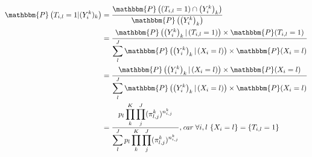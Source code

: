 \documentclass[frenchb]{report}
\newcommand{\1}{\mathbbm{1}}
\newcommand{\prob}{\mathbbm{P}}
\theoremstyle{definition}\newtheorem{defn}{Définition}
\theoremstyle{definition}\newtheorem{exm}{Exemple}
\theoremstyle{definition}\newtheorem{nota}{Notation}
\theoremstyle{definition}\newtheorem{rem}{Remarque}
\begin{document}
\begin{center}
	\begin{align*}
		\prob\left( T_{i,l} = 1 |(Y^k_i)_k \right) &= \displaystyle \frac{\prob \left( \left( T_{i,l} = 1 \right) \cap \left(Y^k_i\right)_k\right)}{\prob \left( \left( Y^k_i \right)_k \right)}\\
		&= \displaystyle \frac{\prob \left( \left(Y^k_i \right)_k | \left( T_{i,l} =1 \right) \right) \times \prob (T_{i,l} = 1)}{\displaystyle \sum_l^J \prob \left( \left(Y^k_i \right)_k | \left( X_i = l \right) \right) \times \prob (X_i = l)}\\
		&= \displaystyle \frac{\prob \left( \left(Y^k_i \right)_k | \left( X_i = l \right) \right) \times \prob (X_i = l)}{\displaystyle \sum_l^J \prob \left( \left(Y^k_i \right)_k | \left( X_i = l \right) \right) \times \prob (X_i = l)}\\
		&= \displaystyle \frac{p_l \displaystyle \prod_k^K \displaystyle \prod_j^J (\pi^k_{l,j})^{n^k_{i,j}}}{\displaystyle \sum_l^J p_l \displaystyle \prod_k^K \displaystyle \prod_j^J (\pi^k_{l,j})^{n^k_{i,j}}}, \textit{car } \forall i,l ~\{X_i = l\} = \{T_{i,l} = 1\}\\
	\end{align*}
\end{center}
\end{document}
